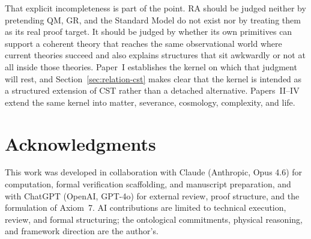\documentclass[11pt]{article}
\begin{document}
That explicit incompleteness is part of the point. RA should be judged neither by pretending QM, GR, and the Standard Model do not exist nor by treating them as its real proof target. It should be judged by whether its own primitives can support a coherent theory that reaches the same observational world where current theories succeed and also explains structures that sit awkwardly or not at all inside those theories. Paper~I establishes the kernel on which that judgment will rest, and Section~\ref{sec:relation-cst} makes clear that the kernel is intended as a structured extension of CST rather than a detached alternative. Papers~II--IV extend the same kernel into matter, severance, cosmology, complexity, and life.

\section*{Acknowledgments}

This work was developed in collaboration with Claude (Anthropic, Opus 4.6) for computation, formal verification scaffolding, and manuscript preparation, and with ChatGPT (OpenAI, GPT-4o) for external review, proof structure, and the formulation of Axiom~7. AI contributions are limited to technical execution, review, and formal structuring; the ontological commitments, physical reasoning, and framework direction are the author's.
\end{document}
